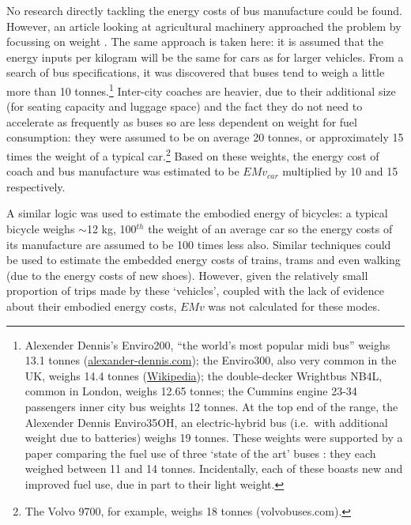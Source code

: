 No research directly tackling the energy costs of bus manufacture could be found.
However, an article looking at agricultural machinery approached the
problem by focussing on weight \citep{Mikkola201023}. The same approach is
taken here: it is assumed that the energy inputs per kilogram will be the same
for cars as for larger vehicles. From a
search of bus specifications, it was discovered that buses tend to weigh
a little more than 10 tonnes.\footnote{Alexender Dennis's
Enviro200, ``the world's \label{fnbuses}
most popular midi bus'' weighs 13.1 tonnes
(\href{http://www.alexander-dennis.com/uploads/files/e200_spec_sheet.pdf}
{alexander-dennis.com}); the Enviro300, also very common
in the UK, weighs 14.4 tonnes
(\href{https://en.wikipedia.org/wiki/Alexander_Dennis_Enviro300}{Wikipedia});
the double-decker Wrightbus NB4L, common in London, weighs 12.65 tonnes; the
Cummins engine 23-34 passengers inner city bus weights 12 tonnes.
At the top end of the range, the Alexender Dennis  Enviro35OH,
an electric-hybrid bus (i.e.~with additional weight due to batteries)
weighs 19 tonnes.
These weights were supported by a paper comparing the fuel use of three
`state of the art' buses \citep{pelkmans2001emissions}:
they each weighed between 11 and 14 tonnes. Incidentally, each of these
boasts new and improved fuel use, due in part to their light weight.
}
Inter-city coaches are heavier, due to their additional size (for seating capacity
and luggage space) and the fact they do not need to accelerate as
frequently as buses so are less dependent on
weight for fuel consumption: they were assumed to be on average 20
tonnes, or approximately 15 times the weight of a typical
car.\footnote{The Volvo 9700, for example, weighs 18 tonnes
(volvobuses.com).}
Based on these weights, the energy cost of coach and bus manufacture was
estimated to be $EMv_{car}$ multiplied by 10 and 15 respectively.

A similar logic was used to estimate the embodied energy of bicycles:
a typical bicycle weighs $\sim$12 kg, 100$^{th}$ the weight of an average
car so the energy costs of its manufacture are assumed to be 100 times less
also.
Similar techniques could be used to estimate the embedded energy costs of
trains, trams and even walking (due to the energy costs of new shoes).
However, given the relatively small proportion of trips made by these
`vehicles', coupled with the lack of evidence about their embodied energy
costs, $EMv$ was not calculated for these modes.

